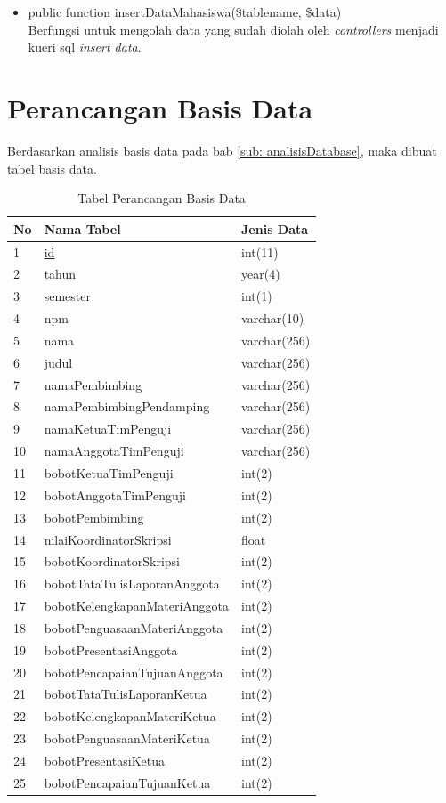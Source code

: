	\begin{itemize}
		\item public function insertDataMahasiswa(\$tablename, \$data)\\
		Berfungsi untuk mengolah data yang sudah diolah oleh \textit{controllers} menjadi kueri sql \textit{insert data}.
	\end{itemize}
	
	\section{Perancangan Basis Data}
	\label{sec: perancanganDatabase}
	
	Berdasarkan analisis basis data pada bab \ref{sub: analisisDatabase}, maka dibuat tabel basis data.
	\begin{table}[H]
	\centering
	\caption{Tabel Perancangan Basis Data}
	\begin{tabular}{| m{0.75cm} | m{7cm} | m{3cm} |}
		\hline
		No & Nama Tabel & Jenis Data\\
		\hline
		1 & \underline{id} & int(11)\\
		\hline
		2 & tahun & year(4)\\
		\hline
		3 & semester & int(1)\\
		\hline
		4 & npm & varchar(10)\\
		\hline
		5 & nama & varchar(256)\\
		\hline
		6 & judul & varchar(256)\\
		\hline
		7 & namaPembimbing & varchar(256)\\
		\hline
		8 & namaPembimbingPendamping & varchar(256)\\
		\hline
		9 & namaKetuaTimPenguji & varchar(256)\\
		\hline
		10 & namaAnggotaTimPenguji & varchar(256)\\
		\hline
		11 & bobotKetuaTimPenguji & int(2)\\
		\hline
		12 & bobotAnggotaTimPenguji & int(2)\\
		\hline
		13 & bobotPembimbing & int(2)\\
		\hline
		14 & nilaiKoordinatorSkripsi & float\\
		\hline
		15 & bobotKoordinatorSkripsi & int(2)\\
		\hline
		16 & bobotTataTulisLaporanAnggota & int(2)\\
		\hline
		17 & bobotKelengkapanMateriAnggota & int(2)\\
		\hline
		18 & bobotPenguasaanMateriAnggota & int(2)\\
		\hline
		19 & bobotPresentasiAnggota & int(2)\\
		\hline
		20 & bobotPencapaianTujuanAnggota & int(2)\\
		\hline
		21 & bobotTataTulisLaporanKetua & int(2)\\
		\hline
		22 & bobotKelengkapanMateriKetua & int(2)\\
		\hline
		23 & bobotPenguasaanMateriKetua & int(2)\\
		\hline
		24 & bobotPresentasiKetua & int(2)\\
		\hline
		25 & bobotPencapaianTujuanKetua & int(2)\\
		\hline
	\end{tabular}
\end{table}
